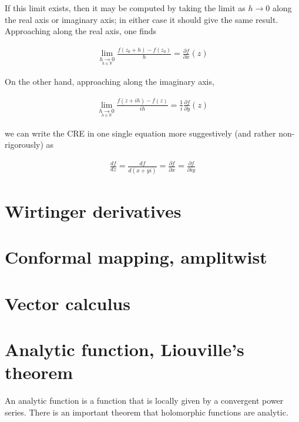 \documentclass{article}
\begin{document}
If this limit exists, then it may be computed by taking the limit as $h \rightarrow 0$ along the real axis or imaginary axis; in either case it should give the same result.  Approaching along the real axis, one finds

\begin{align}
\lim_{\underset{h\in\mathbb{R}}{h\to 0}} \frac{f(z_0+h)-f(z_0)}{h} = \frac{\partial f}{\partial x}(z)
\end{align}

On the other hand, approaching along the imaginary axis,

\begin{align}
\lim_{\underset{h\in \mathbb{R}}{h\to 0}} \frac{f(z+ih)-f(z)}{ih} =\frac{1}{i}\frac{\partial f}{\partial y}(z)
\end{align}

we can write the CRE in one single equation more suggestively (and rather non-rigorously) as

\begin{align}
\frac{d f}{d z} = \frac{d f}{d (x+yi)} = \frac{\partial f}{\partial x}=\frac{\partial f}{\partial iy}
\end{align}

\section{Wirtinger derivatives}
\section{Conformal mapping, amplitwist}
\section{Vector calculus}
\section{Analytic function, Liouville's theorem}

An analytic function is a function that is locally given by a convergent power series. There is an important theorem that holomorphic functions are analytic.
\end{document}
